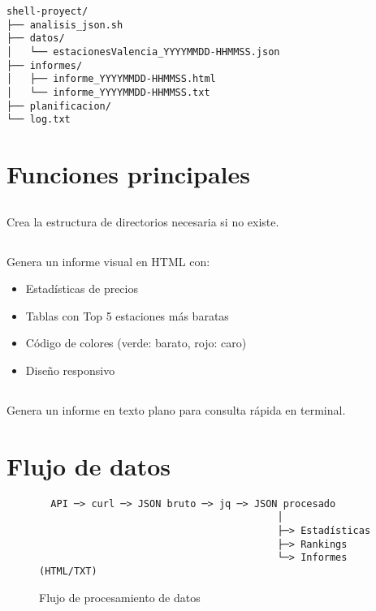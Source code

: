 \begin{lstlisting}[style=bash]
shell-proyect/
├── analisis_json.sh
├── datos/
│   └── estacionesValencia_YYYYMMDD-HHMMSS.json
├── informes/
│   ├── informe_YYYYMMDD-HHMMSS.html
│   └── informe_YYYYMMDD-HHMMSS.txt
├── planificacion/
└── log.txt
\end{lstlisting}

\section{Funciones principales}

\subsection{}

Crea la estructura de directorios necesaria si no existe.

\subsection{}

Genera un informe visual en HTML con:
\begin{itemize}
  \item Estadísticas de precios
  \item Tablas con Top 5 estaciones más baratas
  \item Código de colores (verde: barato, rojo: caro)
  \item Diseño responsivo
\end{itemize}

\subsection{}

Genera un informe en texto plano para consulta rápida en terminal.

\section{Flujo de datos}

\begin{figure}[H]
  \centering
  \begin{verbatim}
  API ─> curl ─> JSON bruto ─> jq ─> JSON procesado
                                         │
                                         ├─> Estadísticas
                                         ├─> Rankings
                                         └─> Informes (HTML/TXT)
  \end{verbatim}
  \caption{Flujo de procesamiento de datos}
  \label{fig:flujo}
\end{figure}

